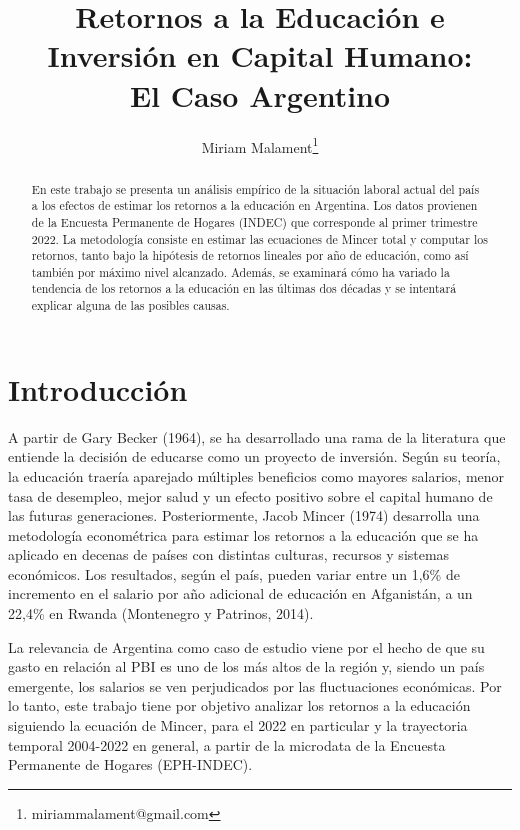 \documentclass[a4paper]{article}
\title{Retornos a la Educación e Inversión en Capital Humano:\\
El Caso Argentino}
\author{Miriam Malament\thanks{miriammalament@gmail.com}}
\date{\vspace{-5ex}}
\theoremstyle{plain}
\theoremstyle{definition}
\begin{document}
	\maketitle
	
	\begin{abstract}
     En este trabajo se presenta un análisis empírico de la situación laboral actual del país a los efectos de estimar los retornos a la educación en Argentina. Los datos provienen de la Encuesta Permanente de Hogares (INDEC) que corresponde al primer trimestre 2022. La metodología consiste en estimar las ecuaciones de Mincer total y computar los retornos, tanto bajo la hipótesis de retornos lineales por año de educación, como así también por máximo nivel alcanzado. Además, se examinará cómo ha variado la tendencia de los retornos a la educación en las últimas dos décadas y se intentará explicar alguna de las posibles causas.  
	\end{abstract}
	
	
\setcounter{page}{1}			%
	
	
\section{Introducción}
\label{sec:intro}

A partir de Gary Becker (1964), se ha desarrollado una rama de la literatura que entiende la decisión de educarse como un proyecto de inversión. Según su teoría, la educación traería aparejado múltiples beneficios como mayores salarios, menor tasa de desempleo, mejor salud y un efecto positivo sobre el capital humano de las futuras generaciones. Posteriormente, Jacob Mincer (1974) desarrolla una metodología econométrica para estimar los retornos a la educación que se ha aplicado en decenas de países con distintas culturas, recursos y sistemas económicos. Los resultados, según el país, pueden variar entre un 1,6\% de incremento en el salario por año adicional de educación en Afganistán, a un 22,4\% en Rwanda (Montenegro y Patrinos, 2014). 

La relevancia de Argentina como caso de estudio viene por el hecho de que su gasto en relación al PBI es uno de los más altos de la región y, siendo un país emergente, los salarios se ven perjudicados por las fluctuaciones económicas. Por lo tanto, este trabajo tiene por objetivo analizar los retornos a la educación siguiendo la ecuación de Mincer, para el 2022 en particular y la trayectoria temporal 2004-2022 en general, a partir de la microdata de la Encuesta Permanente de Hogares (EPH-INDEC). 
\end{document}

